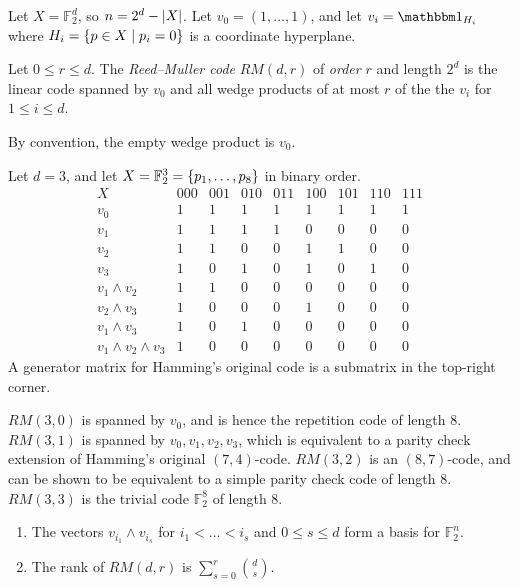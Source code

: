 Let \( X = \mathbb F_2^d \), so \( n = 2^d - \abs{X} \).
Let \( v_0 = (1, \dots, 1) \), and let \( v_i = \mathbbm 1_{H_i} \) where \( H_i = \qty{p \in X \mid p_i = 0} \) is a coordinate hyperplane.
\begin{definition}
    Let \( 0 \leq r \leq d \).
    The \emph{Reed--Muller code} \( RM(d,r) \) of \emph{order} \( r \) and length \( 2^d \) is the linear code spanned by \( v_0 \) and all wedge products of at most \( r \) of the the \( v_i \) for \( 1 \leq i \leq d \).
\end{definition}
By convention, the empty wedge product is \( v_0 \).
\begin{example}
    Let \( d = 3 \), and let \( X = \mathbb F_2^3 = \qty{p_1, \dots, p_8} \) in binary order.
    \[ \begin{array}{c|cccccccc}
        X & 000 & 001 & 010 & 011 & 100 & 101 & 110 & 111 \\\hline
        v_0 & 1 & 1 & 1 & 1 & 1 & 1 & 1 & 1 \\
        v_1 & 1 & 1 & 1 & 1 & 0 & 0 & 0 & 0 \\
        v_2 & 1 & 1 & 0 & 0 & 1 & 1 & 0 & 0 \\
        v_3 & 1 & 0 & 1 & 0 & 1 & 0 & 1 & 0 \\
        v_1 \wedge v_2 & 1 & 1 & 0 & 0 & 0 & 0 & 0 & 0 \\
        v_2 \wedge v_3 & 1 & 0 & 0 & 0 & 1 & 0 & 0 & 0 \\
        v_1 \wedge v_3 & 1 & 0 & 1 & 0 & 0 & 0 & 0 & 0 \\
        v_1 \wedge v_2 \wedge v_3 & 1 & 0 & 0 & 0 & 0 & 0 & 0 & 0
    \end{array} \]
    A generator matrix for Hamming's original code is a submatrix in the top-right corner.
\end{example}
\( RM(3,0) \) is spanned by \( v_0 \), and is hence the repetition code of length 8.
\( RM(3,1) \) is spanned by \( v_0, v_1, v_2, v_3 \), which is equivalent to a parity check extension of Hamming's original \( (7,4) \)-code.
\( RM(3,2) \) is an \( (8,7) \)-code, and can be shown to be equivalent to a simple parity check code of length 8.
\( RM(3,3) \) is the trivial code \( \mathbb F_2^8 \) of length 8.
\begin{theorem}
    \begin{enumerate}
        \item The vectors \( v_{i_1} \wedge v_{i_s} \) for \( i_1 < \dots < i_s \) and \( 0 \leq s \leq d \) form a basis for \( \mathbb F_2^n \).
        \item The rank of \( RM(d,r) \) is \( \sum_{s=0}^r \binom{d}{s} \).
    \end{enumerate}
\end{theorem}
